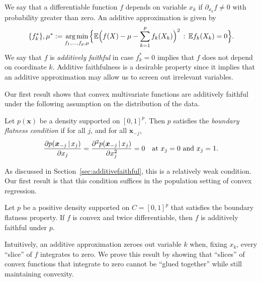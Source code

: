 We say that a differentiable function $f$ depends on variable $x_k$ if
$\partial_{x_k} f \neq 0$ with probability greater than zero.  An additive approximation is given by
\begin{equation}
\{f_k^*\}, \mu^* := \mathop{\text{\rm arg\,min}}_{f_1,\ldots, f_p, \mu} \Bigl\{ 
             {\mathbb E} \Bigl( f(X) - \mu - \sum_{k=1}^p f_k(X_k)\Bigr)^2 
         \,:\, {\mathbb E} f_k(X_k) = 0 \Bigr\}.
\end{equation}
We say that $f$ is \textit{additively faithful} in case $f^*_k = 0$
implies that $f$ does not depend on coordinate $k$.
Additive faithfulness is a desirable property
since it implies that an additive approximation may allow us to 
screen out irrelevant variables.

Our first result shows that convex multivariate functions are
additively faithful
under the following assumption on the distribution of the data.
\begin{definition}
  Let $p(\mathbf{x})$ be a density supported on $[0,1]^p$.  Then $p$
  satisfies the \emph{boundary flatness condition} if for all $j$, and
  for all $\mathbf{x}_{-j}$,
\[
\frac{\partial p(\mbox{\boldmath $x$}_{-j} {\,|\,} x_j)}{\partial x_j}  =  
\frac{\partial^2 p(\mbox{\boldmath $x$}_{-j} {\,|\,} x_j)}{\partial x_j^2} = 0
\quad \textrm{at $x_j = 0$ and $x_j = 1$}.
\]
\end{definition}

As discussed in Section~\ref{sec:additivefaithful}, this is a relatively weak condition. 
Our first result is that this condition suffices in the population
setting of convex regression.

\begin{stheorem}
  Let $p$ be a positive density supported on $C=[0,1]^p$ that
  satisfies the boundary flatness property. If $f$ is convex and twice
  differentiable, then $f$ is additively faithful under $p$.
\end{stheorem}


Intuitively, an additive approximation zeroes out variable $k$ when, fixing $x_k$, every
``slice'' of $f$ integrates to zero. We prove this result
by showing that ``slices'' of convex
functions that integrate to zero cannot be ``glued together'' while
still maintaining convexity.

